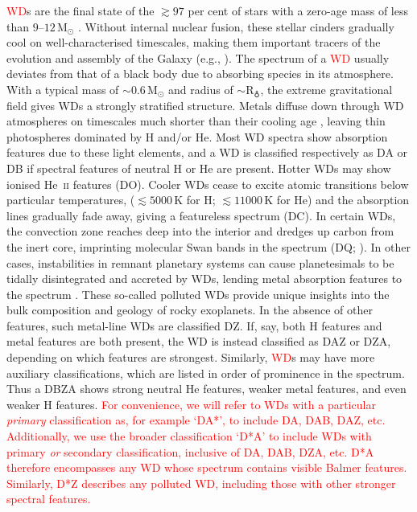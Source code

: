 \documentclass[fleqn,usenatbib]{mnras}
\newcommand{\red}[1]{\textcolor{red}{#1}}
\begin{document}
\red{WD}s are the final state of the $\gtrsim97$ per cent of stars with a zero-age mass of less than $9$--$12\,\mathrm{M}_\odot$ \citep{lauffer18, althaus10, althaus21}.
Without internal nuclear fusion, these stellar cinders gradually cool on well-characterised timescales, making them important tracers of the evolution and assembly of the Galaxy (e.g., \citealt{winget87, tremblay14}).
The spectrum of a \red{WD} usually deviates from that of a black body due to absorbing species in its atmosphere.
With a typical mass of $\sim0.6\,\mathrm{M}_\odot$ and radius of $\sim \mathrm{R}_{\earth}$, the extreme gravitational field gives WDs a strongly stratified structure.
Metals diffuse down through WD atmospheres on timescales much shorter than their cooling age \citep{schatzman45, paquette86, koester09, wyatt14}, leaving thin photospheres dominated by H and/or He.
Most WD spectra show absorption features due to these light elements, and a WD is classified respectively as DA or DB if spectral features of neutral H or He are present.
Hotter WDs may show ionised  He~\textsc{ii} features (DO).
Cooler WDs cease to excite atomic transitions below particular temperatures, ($\lesssim5000\,\text{K}$ for H; $\lesssim 11000\,\text{K}$ for He) and the absorption lines gradually fade away, giving a featureless spectrum (DC).
In certain WDs, the convection zone reaches deep into the interior and dredges up carbon from the inert core, imprinting molecular  Swan bands in the spectrum (DQ; \citealt{fontaine84, koester82, koester20, blouin23}).
In other cases, instabilities in remnant planetary systems can cause planetesimals to be tidally disintegrated and accreted by WDs, lending metal absorption features to the spectrum \citep{bonsor11, frewen14, mustill18, maldonado20}.
These so-called polluted WDs provide unique insights into the bulk composition and geology of rocky exoplanets.
In the absence of other features, such metal-line WDs are classified DZ.
If, say, both H features and metal features are both present, the WD is instead classified as DAZ or DZA, depending on which features are strongest.
Similarly, \red{WD}s may have more auxiliary classifications, which are listed in order of prominence in the spectrum.
Thus a DBZA shows strong neutral He features, weaker metal features, and even weaker H features. \red{For convenience, we will refer to WDs with a particular \textit{primary} classification as, for example `DA*', to include DA, DAB, DAZ, etc.
Additionally, we use the broader classification `D*A' to include WDs with primary \textit{or} secondary classification, inclusive of DA, DAB, DZA, etc.
D*A therefore encompasses any WD whose spectrum contains visible Balmer features.
Similarly, D*Z describes any polluted WD, including those with other stronger spectral features.}
\end{document}
